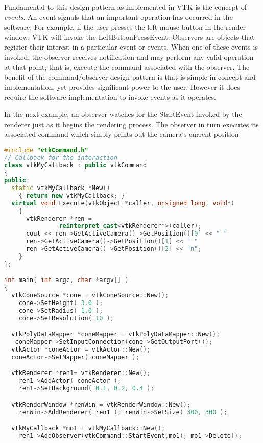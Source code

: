 \begin{description}[leftmargin=0cm,labelindent=0cm]
Fundamental to this design pattern as implemented in VTK is the concept of \emph{events}. An event signals that an important operation has occurred in the software. For example, if the user presses the left mouse button in the render window, VTK will invoke the LeftButtonPressEvent. Observers are objects that register their interest in a particular event or events. When one of these events is invoked, the observer receives notification and may perform any valid operation at that point; that is, execute the command associated with the observer. The benefit of the command/observer design pattern is that is simple in concept and implementation, yet provides significant power to the user. However it does require the software implementation to invoke events as it operates.

In the next example, an observer watches for the StartEvent invoked by the renderer just as it begins the rendering process. The observer in turn executes its associated command which simply prints out the camera's current position.

\begin{lstlisting}[language=C++, caption={}]
#include "vtkCommand.h"
// Callback for the interaction
class vtkMyCallback : public vtkCommand
{
public:
  static vtkMyCallback *New()
    { return new vtkMyCallback; }
  virtual void Execute(vtkObject *caller, unsigned long, void*)
    {
      vtkRenderer *ren =
               reinterpret_cast<vtkRenderer*>(caller);
      cout << ren->GetActiveCamera()->GetPosition()[0] << " "
      ren->GetActiveCamera()->GetPosition()[1] << " "
      ren->GetActiveCamera()->GetPosition()[2] << "n";
    }
};

int main( int argc, char *argv[] )
{
  vtkConeSource *cone = vtkConeSource::New();
    cone->SetHeight( 3.0 );
    cone->SetRadius( 1.0 );
    cone->SetResolution( 10 );

  vtkPolyDataMapper *coneMapper = vtkPolyDataMapper::New();
   coneMapper->SetInputConnection(cone->GetOutputPort());
  vtkActor *coneActor = vtkActor::New();
  coneActor->SetMapper( coneMapper );

  vtkRenderer *ren1= vtkRenderer::New();
    ren1->AddActor( coneActor );
    ren1->SetBackground( 0.1, 0.2, 0.4 );

  vtkRenderWindow *renWin = vtkRenderWindow::New();
    renWin->AddRenderer( ren1 ); renWin->SetSize( 300, 300 );

  vtkMyCallback *mo1 = vtkMyCallback::New();
    ren1->AddObserver(vtkCommand::StartEvent,mo1); mo1->Delete();


\end{lstlisting}
\end{description}
